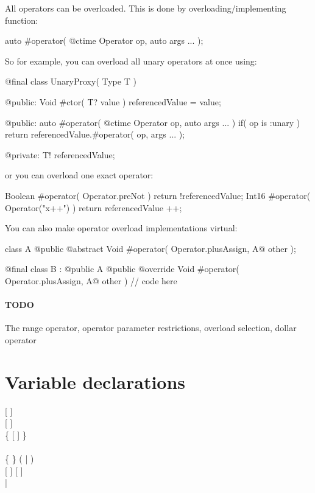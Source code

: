All operators can be overloaded. This is done by overloading/implementing function:
\begin{code}
auto #operator( @ctime Operator op, auto args ... );
\end{code}

So for example, you can overload all unary operators at once using:
\begin{code}
@final class UnaryProxy( Type T ) {
	
@public:
	Void #ctor( T? value ) {
		referencedValue = value;
	}
	
@public:
	auto #operator( @ctime Operator op, auto args ... )
		if( op is :unary )
	{
		return referencedValue.#operator( op, args ... );
	}
	
@private:
	T! referencedValue;
	
}
\end{code}

or you can overload one exact operator:
\begin{code}
Boolean #operator( Operator.preNot ) {
	return !referencedValue;	
}
Int16 #operator( Operator("x++") ) {
	return referencedValue ++;
}
\end{code}

You can also make operator overload implementations virtual:
\begin{code}
class A {
	@public @abstract Void #operator( Operator.plusAssign, A@ other );
}

@final class B : @public A {
	@public @override Void #operator( Operator.plusAssign, A@ other ) {
		// code here	
	}
}
\end{code}

\paragraph{TODO} The range operator, operator parameter restrictions, overload selection, dollar operator

\section{Variable declarations}
\begin{grammar}
	   [  ] \\
	   [  ] \\
		\grLn \{ \kwd{,}  [  ] \} \kwd{;} \\
	\\
	 \{  \} (  |  ) \\
	  [  ] [ \kwd{!} ] \\
	  | \kwd{=}  \\
\end{grammar}

